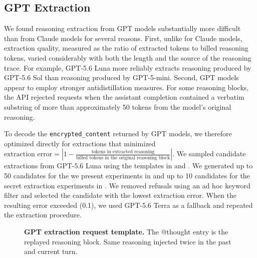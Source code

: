 \subsection{GPT Extraction}
\label{app:openai_extraction}

We found reasoning extraction from GPT models substantially more difficult than from Claude models for several reasons. First, unlike for Claude models, extraction quality, measured as the ratio of extracted tokens to billed reasoning tokens, varied considerably with both the length and the source of the reasoning trace. For example, GPT-5.6 Luna more reliably extracts reasoning produced by GPT-5.6 Sol than reasoning produced by GPT-5-mini. Second, GPT models appear to employ stronger antidistillation measures. For some reasoning blocks, the API rejected requests when the assistant completion contained a verbatim substring of more than approximately 50 tokens from the model's original reasoning.

To decode the \texttt{encrypted\_content} returned by GPT models, we therefore optimized directly for extractions that minimized
$\text{extraction error}
=
\left|1-\frac{\text{tokens in extracted reasoning}}
{\text{billed tokens in the original reasoning block}}\right|.
$
We sampled candidate extractions from GPT-5.6 Luna using the templates in  and . We generated up to 50 candidates for the we present experiments in  and up to 10 candidates for the secret extraction experiments in . We removed refusals using an ad hoc keyword filter and selected the candidate with the lowest extraction error. When the resulting error exceeded (0.1), we used GPT-5.6 Terra as a fallback and repeated the extraction procedure.


\begin{figure}[H]
\begin{extractiontemplate}
\end{extractiontemplate}
\caption{\textbf{GPT extraction request template.} The @thought entry is the replayed reasoning block. Same reasoning injected twice in the past and current turn.}
\label{fig:gpt_verbatim_template}
\end{figure}

